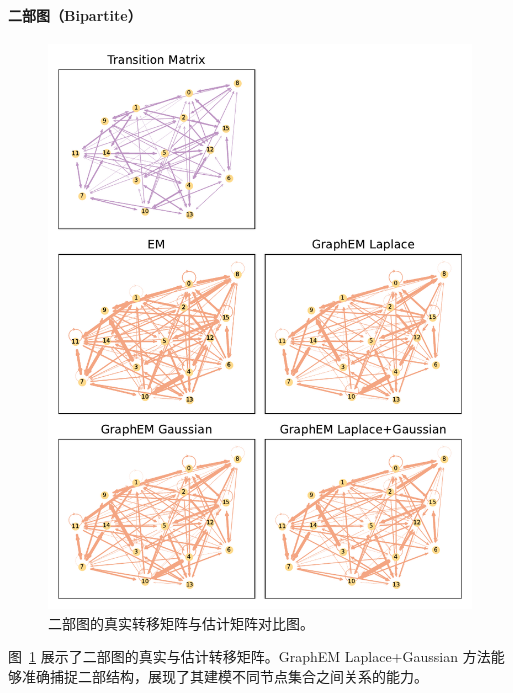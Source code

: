 \paragraph*{二部图（Bipartite）}
\begin{figure}[tb]
    \centering
    \includegraphics[width=0.75\linewidth]{fig/bipartite/graphs_for_true_and_EM.pdf}
    \caption{二部图的真实转移矩阵与估计矩阵对比图。}
    \label{fig: bipartite graph comparison}
\end{figure}

图~\ref{fig: bipartite graph comparison} 展示了二部图的真实与估计转移矩阵。GraphEM Laplace+Gaussian 方法能够准确捕捉二部结构，展现了其建模不同节点集合之间关系的能力。

